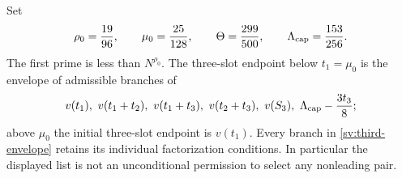 Set
\[
 \rho_0=\frac{19}{96},\qquad \mu_0=\frac{25}{128},\qquad
 \Theta=\frac{299}{500},\qquad \Lambda_{\rm cap}=\frac{153}{256}.
\]
The first prime is less than $N^{\rho_0}$.  The three-slot endpoint
below $t_1=\mu_0$ is the envelope of admissible branches of
\begin{equation}\label{sv:third-envelope}
 v(t_1),\ v(t_1+t_2),\ v(t_1+t_3),\ v(t_2+t_3),\ v(S_3),\
                         \Lambda_{\rm cap}-\frac{3t_3}{8};
\end{equation}
above $\mu_0$ the initial three-slot endpoint is $v(t_1)$.
Every branch in \eqref{sv:third-envelope} retains its individual
factorization conditions.  In particular the displayed list is not
an unconditional permission to select any nonleading pair.
